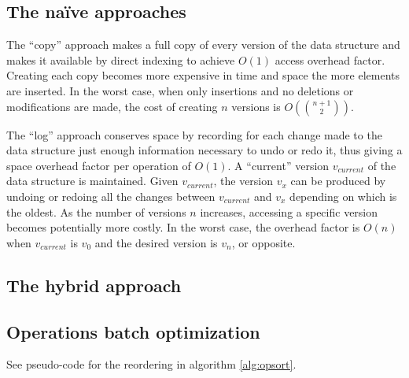 \subsection{The na\"ive approaches}
The ``copy'' approach makes a full copy of every version of the data structure
and makes it available by direct indexing to achieve $O(1)$ access overhead
factor. Creating each copy becomes more expensive in time and space the more
elements are inserted. In the worst case, when only insertions and no deletions
or modifications are made, the cost of creating $n$ versions is
$O\left(\binom{n+1}{2}\right)$.

The ``log'' approach conserves space by recording for each change made to the
data structure just enough information necessary to undo or redo it, thus giving
a space overhead factor per operation of $O(1)$. A ``current'' version
$v_{current}$ of the data structure is maintained. Given $v_{current}$, the
version $v_x$ can be produced by undoing or redoing all the changes between
$v_{current}$ and $v_x$ depending on which is the oldest. As the number of
versions $n$ increases, accessing a specific version becomes potentially more
costly. In the worst case, the overhead factor is $O(n)$ when $v_{current}$ is
$v_0$ and the desired version is $v_n$, or opposite.

\subsection{The hybrid approach}

\subsection{Operations batch optimization}
See pseudo-code for the reordering in algorithm \ref{alg:opsort}.

